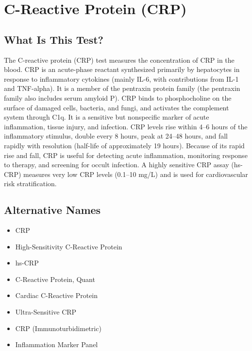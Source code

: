 \chapter{C-Reactive Protein (CRP)}

\section*{What Is This Test?}
The C-reactive protein (CRP) test measures the concentration of CRP in the blood. CRP is an acute-phase reactant synthesized primarily by hepatocytes in response to inflammatory cytokines (mainly IL-6, with contributions from IL-1 and TNF-alpha). It is a member of the pentraxin protein family (the pentraxin family also includes serum amyloid P). CRP binds to phosphocholine on the surface of damaged cells, bacteria, and fungi, and activates the complement system through C1q. It is a sensitive but nonspecific marker of acute inflammation, tissue injury, and infection. CRP levels rise within 4--6 hours of the inflammatory stimulus, double every 8 hours, peak at 24--48 hours, and fall rapidly with resolution (half-life of approximately 19 hours). Because of its rapid rise and fall, CRP is useful for detecting acute inflammation, monitoring response to therapy, and screening for occult infection. A highly sensitive CRP assay (hs-CRP) measures very low CRP levels (0.1--10 mg/L) and is used for cardiovascular risk stratification.

\section*{Alternative Names}
\begin{itemize}
  \item CRP
  \item High-Sensitivity C-Reactive Protein
  \item hs-CRP
  \item C-Reactive Protein, Quant
  \item Cardiac C-Reactive Protein
  \item Ultra-Sensitive CRP
  \item CRP (Immunoturbidimetric)
  \item Inflammation Marker Panel
\end{itemize}
